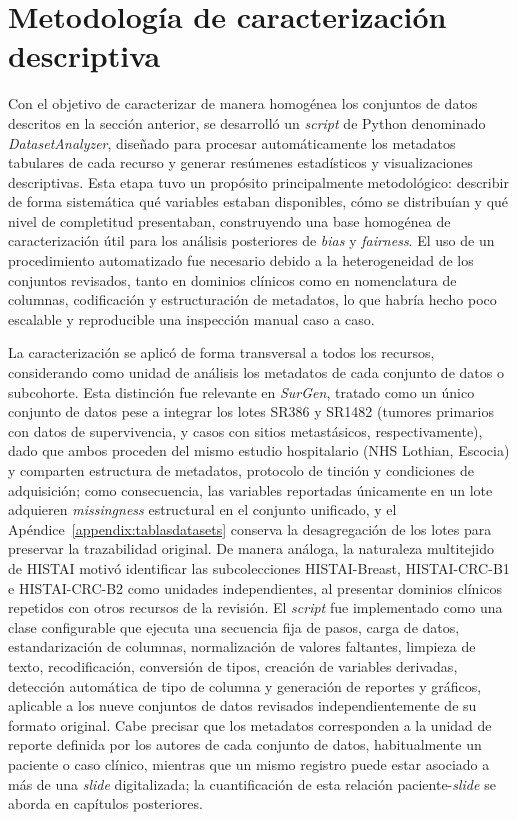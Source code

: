 \section{Metodología de caracterización descriptiva}

Con el objetivo de caracterizar de manera homogénea los conjuntos de datos descritos en la sección anterior, se desarrolló un \textit{script} de Python denominado \textit{DatasetAnalyzer}, diseñado para procesar automáticamente los metadatos tabulares de cada recurso y generar resúmenes estadísticos y visualizaciones descriptivas. Esta etapa tuvo un propósito principalmente metodológico: describir de forma sistemática qué variables estaban disponibles, cómo se distribuían y qué nivel de completitud presentaban, construyendo una base homogénea de caracterización útil para los análisis posteriores de \textit{bias} y \textit{fairness}. El uso de un procedimiento automatizado fue necesario debido a la heterogeneidad de los conjuntos revisados, tanto en dominios clínicos como en nomenclatura de columnas, codificación y estructuración de metadatos, lo que habría hecho poco escalable y reproducible una inspección manual caso a caso.

La caracterización se aplicó de forma transversal a todos los recursos, considerando como unidad de análisis los metadatos de cada conjunto de datos o subcohorte. Esta distinción fue relevante en \textit{SurGen}, tratado como un único conjunto de datos pese a integrar los lotes SR386 y SR1482 (tumores primarios con datos de supervivencia, y casos con sitios metastásicos, respectivamente), dado que ambos proceden del mismo estudio hospitalario (NHS Lothian, Escocia) y comparten estructura de metadatos, protocolo de tinción y condiciones de adquisición; como consecuencia, las variables reportadas únicamente en un lote adquieren \textit{missingness} estructural en el conjunto unificado, y el Apéndice~\ref{appendix:tablasdatasets} conserva la desagregación de los lotes para preservar la trazabilidad original. De manera análoga, la naturaleza multitejido de HISTAI motivó identificar las subcolecciones HISTAI-Breast, HISTAI-CRC-B1 e HISTAI-CRC-B2 como unidades independientes, al presentar dominios clínicos repetidos con otros recursos de la revisión. El \textit{script} fue implementado como una clase configurable que ejecuta una secuencia fija de pasos, carga de datos, estandarización de columnas, normalización de valores faltantes, limpieza de texto, recodificación, conversión de tipos, creación de variables derivadas, detección automática de tipo de columna y generación de reportes y gráficos, aplicable a los nueve conjuntos de datos revisados independientemente de su formato original. Cabe precisar que los metadatos corresponden a la unidad de reporte definida por los autores de cada conjunto de datos, habitualmente un paciente o caso clínico, mientras que un mismo registro puede estar asociado a más de una \textit{slide} digitalizada; la cuantificación de esta relación paciente-\textit{slide} se aborda en capítulos posteriores.

